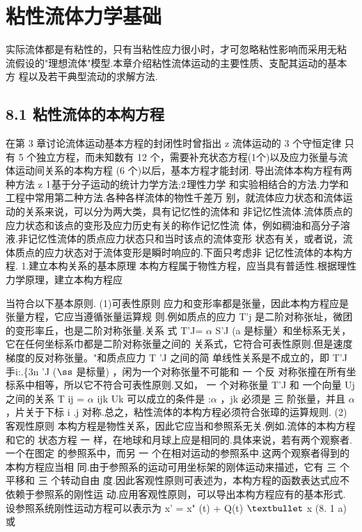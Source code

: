 \chapter{粘性流体力学基础}
实际流体都是有粘性的，只有当粘性应力很小时，才可忽略粘性影响而采用无粘 流假设的"理想流体"模型.本章介绍粘性流体运动的主要性质、支配其运动的基本方 程以及若干典型流动的求解方法.

\section*{8.1  粘性流体的本构方程}

在第 3 章讨论流体运动基本方程的封闭性时曾指出 z 流体运动的 3 个守恒定律 只有 5 个独立方程，而未知数有 12 个，需要补充状态方程(1个)以及应力张量与流 体运动间关系的本构方程 (6 个)以后，基本方程才能封闭. 导出流体本构方程有两种方法 z ${\rm 1}$基于分子运动的统计力学方法;${\rm 2}$理性力学 和实验相结合的方法.力学和工程中常用第二种方法.各种各样流体的物性千差万 别，就流体应力状态和流体运动的关系来说，可以分为两大类，具有记忆性的流体和 非记忆性流体.流体质点的应力状态和该点的变形及应力历史有关的称作记忆性流 体，例如稠油和高分子溶液.非记忆性流体的质点应力状态只和当时该点的流体变形 状态有关，或者说，流体质点的应力状态对于流体变形是瞬时响应的.下面只考虑非 记忆性流体的本构方程. 1.建立本构关系的基本原理 本构方程属于物性方程，应当具有普适性.根据理性力学原理，建立本构方程应

当符合以下基本原则. (1)可表性原则 应力和变形率都是张量，因此本构方程应是张量方程，它应当遵循张量运算规 则.例如质点的应力 T'j 是二阶对称张址，微团的变形率丘，也是二阶对称张量.关系 式 T'J= $\alpha$ S'J (a 是标量〉和坐标系无关，它在任何坐标系巾都是二阶对称张量之间的 关系式，它符合可表性原则.但是速度梯度的反对称张量。"和质点应力 T 'J 之间的简 单线性关系是不成立的，即 T'J 手i:.\{3n 'J (${\rm ß}$ 是标量) ，闲为一个对称张量不可能和 一 个反 对称张撞在所有坐标系中相等，所以它不符合可表性原则.又如， 一 个对称张量 T'J 和 一个向量 Uj 之间的关系 T ij = $\alpha$ ijk Uk 可以成立的条件是 :$\alpha$ ，jk 必须是 三 阶张量，并且 $\alpha$ ，片关于下标 i .j 对称.总之，粘性流体的本构方程必须符合张璋的运算规则. (2) 客观性原则 本构方程是物性关系，因此它应当和参照系无关.例如.流体的本构方程和它的 状态方程 一 样，在地球和月球上应是相同的.具体来说，若有两个观察者.一个在图定 的参照系中，而另 一 个在相对运动的参照系中.这两个观察者得到的本构方程应当相 同.由于参照系的运动可用坐标架的刚体运动来描述，它有 三 个平移和 三 个转动自由 度.因此客观性原则可表述为，本构方程的函数表达式应不依赖于参照系的刚性运 动.应用客观性原则，可以导出本构方程应有的基本形式. 设参照系统刚性运动方程可以表示为 x' = x" (t) + Q(t) ${\rm •}$ x (8. 1 a) 或

